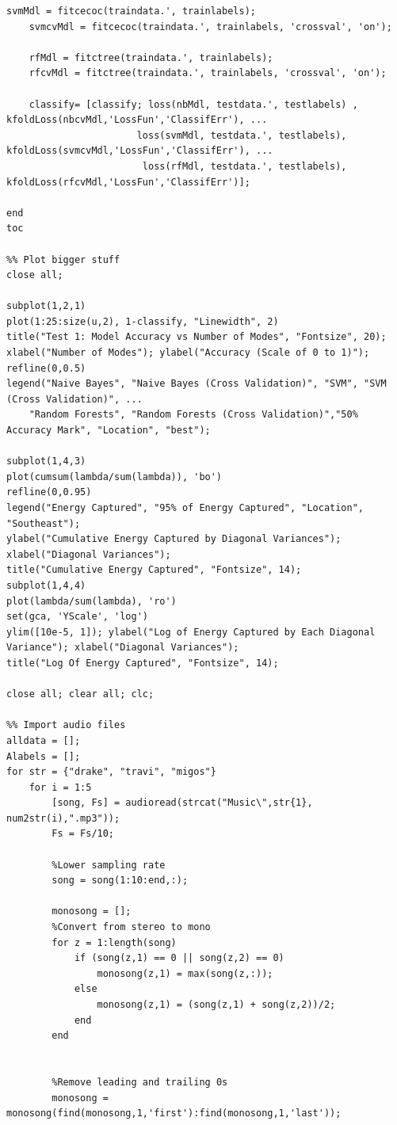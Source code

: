 \documentclass{article}
\begin{document}
\begin{lstlisting}[style=Matlab-editor]
    svmMdl = fitcecoc(traindata.', trainlabels);
    svmcvMdl = fitcecoc(traindata.', trainlabels, 'crossval', 'on');

    rfMdl = fitctree(traindata.', trainlabels);
    rfcvMdl = fitctree(traindata.', trainlabels, 'crossval', 'on');
    
    classify= [classify; loss(nbMdl, testdata.', testlabels) , kfoldLoss(nbcvMdl,'LossFun','ClassifErr'), ...
                       loss(svmMdl, testdata.', testlabels), kfoldLoss(svmcvMdl,'LossFun','ClassifErr'), ...
                        loss(rfMdl, testdata.', testlabels), kfoldLoss(rfcvMdl,'LossFun','ClassifErr')];
                    
end
toc

%% Plot bigger stuff
close all;

subplot(1,2,1)
plot(1:25:size(u,2), 1-classify, "Linewidth", 2)
title("Test 1: Model Accuracy vs Number of Modes", "Fontsize", 20);
xlabel("Number of Modes"); ylabel("Accuracy (Scale of 0 to 1)");
refline(0,0.5)
legend("Naive Bayes", "Naive Bayes (Cross Validation)", "SVM", "SVM (Cross Validation)", ...
    "Random Forests", "Random Forests (Cross Validation)","50% Accuracy Mark", "Location", "best");

subplot(1,4,3)
plot(cumsum(lambda/sum(lambda)), 'bo')
refline(0,0.95)
legend("Energy Captured", "95% of Energy Captured", "Location", "Southeast");
ylabel("Cumulative Energy Captured by Diagonal Variances"); xlabel("Diagonal Variances");
title("Cumulative Energy Captured", "Fontsize", 14);
subplot(1,4,4)
plot(lambda/sum(lambda), 'ro')
set(gca, 'YScale', 'log')
ylim([10e-5, 1]); ylabel("Log of Energy Captured by Each Diagonal Variance"); xlabel("Diagonal Variances");
title("Log Of Energy Captured", "Fontsize", 14);

close all; clear all; clc;

%% Import audio files
alldata = [];
Alabels = [];
for str = {"drake", "travi", "migos"}
    for i = 1:5
        [song, Fs] = audioread(strcat("Music\",str{1}, num2str(i),".mp3"));
        Fs = Fs/10;

        %Lower sampling rate
        song = song(1:10:end,:);
        
        monosong = [];
        %Convert from stereo to mono
        for z = 1:length(song)
            if (song(z,1) == 0 || song(z,2) == 0)
                monosong(z,1) = max(song(z,:));
            else
                monosong(z,1) = (song(z,1) + song(z,2))/2;
            end
        end


        %Remove leading and trailing 0s
        monosong = monosong(find(monosong,1,'first'):find(monosong,1,'last'));


\end{lstlisting}
\end{document}
